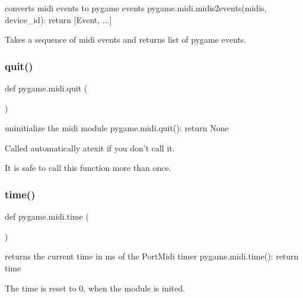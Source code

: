\begin{DoxyVerb}converts midi events to pygame events
pygame.midi.midis2events(midis, device_id): return [Event, ...]

Takes a sequence of midi events and returns list of pygame events.
\end{DoxyVerb}
 \mbox{\label{namespacepygame_1_1midi_acd13a2df48ba49d2d7b54c41041b5947}} 
\subsubsection{\texorpdfstring{quit()}{quit()}}
{\footnotesize\ttfamily def pygame.\+midi.\+quit (\begin{DoxyParamCaption}{ }\end{DoxyParamCaption})}

\begin{DoxyVerb}uninitialize the midi module
pygame.midi.quit(): return None


Called automatically atexit if you don't call it.

It is safe to call this function more than once.
\end{DoxyVerb}
 \mbox{\label{namespacepygame_1_1midi_a2f81b7e8c7f654aa21fe687b2a9cc51c}} 
\subsubsection{\texorpdfstring{time()}{time()}}
{\footnotesize\ttfamily def pygame.\+midi.\+time (\begin{DoxyParamCaption}{ }\end{DoxyParamCaption})}

\begin{DoxyVerb}returns the current time in ms of the PortMidi timer
pygame.midi.time(): return time

The time is reset to 0, when the module is inited.
\end{DoxyVerb}
 